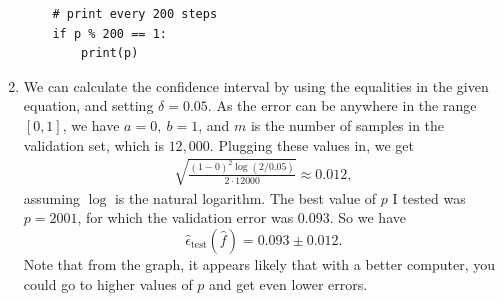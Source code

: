 \documentclass{article}
\begin{document}
\begin{enumerate}
\begin{verbatim}
    # print every 200 steps
    if p % 200 == 1:
        print(p)
        \end{verbatim}

        \item
        We can calculate the confidence interval by using the equalities in the given equation, and setting $\delta=0.05$.
        As the error can be anywhere in the range $[0,1]$, we have $a=0,~b=1$, and $m$ is the number of samples in the validation set, which is $12,000$.
        Plugging these values in, we get
        \begin{align*}
                \sqrt{\frac{(1-0)^2 \log(2/0.05)}{2 \cdot 12000}} \approx 0.012,
        \end{align*}
        assuming $\log$ is the natural logarithm.
        The best value of $p$ I tested was $p=2001$, for which the validation error was $0.093$.
        So we have $$\hat{\epsilon}_\text{test}(\hat{f}) = 0.093 \pm 0.012.$$
        Note that from the graph, it appears likely that with a better computer, you could go to higher values of $p$ and get even lower errors.
\end{enumerate}
\end{document}
